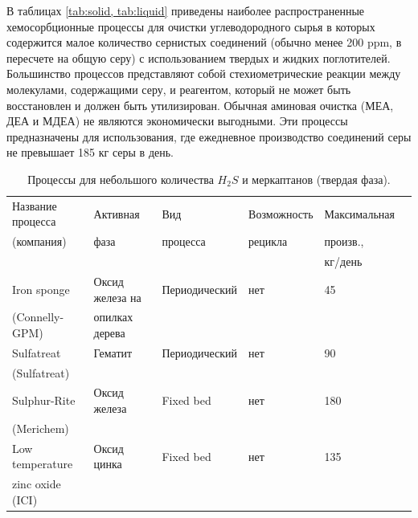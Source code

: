 В таблицах \cref{tab:solid, tab:liquid} приведены наиболее распространенные хемосорбционные процессы для очистки углеводородного сырья в которых содержится малое количество сернистых соединений \cite{foral_evaluation_1995} (обычно менее \num{200} ppm, в пересчете на общую серу) с использованием твердых и жидких поглотителей. Большинство процессов представляют собой стехиометрические реакции между молекулами, содержащими серу, и реагентом, который не может быть восстановлен и должен быть утилизирован. Обычная аминовая очистка (МЕА, ДЕА и МДЕА) не являются экономически выгодными. Эти процессы предназначены для использования, где ежедневное производство соединений серы не превышает \num{185} кг серы в день.  

\begin{table}
	\centering
	\fontsize{12}{15}\selectfont %
	\captionsetup{justification=centering} %
	\caption{Процессы для небольшого количества $H_2S$ и меркаптанов (твердая фаза)\cite{abdulrahman_natural_2012, kohl_gas_1997, de_angelis_natural_2012}.} \label{tab:solid}
	\begin{tabular}{lllllc}
		\toprule
		Название процесса & Активная        & Вид           & Возможность & Максимальная &  \\
		(компания)        & фаза            & процесса      & рецикла     & произв.,     &  \\
		                  &                 &               &             & кг/день      &  \\ \midrule
		Iron sponge       & Оксид железа на & Периодический & нет         & \num{45}     &  \\
		(Connelly-GPM)    & опилках дерева  &               &             &              &  \\
		Sulfatreat        & Гематит         & Периодический & нет         & \num{90}     &  \\
		(Sulfatreat)      &                 &               &             &              &  \\
		Sulphur-Rite      & Оксид железа    & Fixed bed     & нет         & \num{180}    &  \\
		(Merichem)        &                 &               &             &              &  \\
		Low temperature   & Оксид цинка     & Fixed bed     & нет         & \num{135}    &  \\
		zinc oxide (ICI)  &                 &               &             &              &  \\

\end{tabular}
\end{table}

